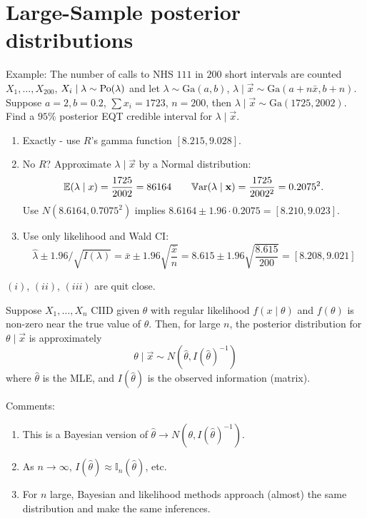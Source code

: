 \documentclass[10pt, a4paper]{article}
\begin{document}
\section{Large-Sample posterior distributions}
Example:
The number of calls to NHS $111$ in $200$ short intervals are counted $X_1, \dotsc, X_{200}$,
$X_i \mid \lambda \sim \operatorname{Po}(\lambda)$ and let $\lambda \sim \mathrm{Ga}(a, b)$,
$\lambda \mid \vec{x} \sim \mathrm{Ga}(a + n\bar{x}, b + n)$.
Suppose $a = 2, b = 0.2$,
$\sum x_i = 1723$,
$n = 200$,
then $\lambda \mid \vec{x} \sim \mathrm{Ga}(1725, 2002)$.
Find a $95\%$ posterior EQT credible interval for $\lambda \mid \vec{x}$.
\begin{enumerate}[label = (\roman*)]
    \item Exactly -
    use $R$'s gamma function $[8.215, 9.028]$.

    \item No $R$?
    Approximate $\lambda \mid \vec{x}$ by a Normal distribution:
    \[
    \mathbb{E}(\lambda \mid x) = \frac{1725}{2002} = 86164\qquad \mathbb{V}\mathrm{ar}(\lambda \mid \mathbf{x}) = \frac{1725}{2002 ^ 2} = 0.2075 ^ 2.
    \]
    Use $N(8.6164, 0.7075 ^ 2)$ implies $8.6164 \pm 1.96 \cdot 0.2075 = [8.210, 9.023]$.

    \item Use only likelihood and Wald CI:
    \[
    \hat{\lambda} \pm 1.96 / \sqrt{I(\lambda)} = \bar{x} \pm 1.96\sqrt{\frac{\bar{x}}{n}} = 8.615 \pm 1.96\sqrt{\frac{8.615}{200}} = [8.208, 9.021]
    \]
\end{enumerate}
$(i)$,
$(ii)$,
$(iii)$ are quit close.

\begin{proposition}
    Suppose $X_1, \dotsc, X_n$ CIID given $\theta$ with regular likelihood $f(x \mid \theta)$ and $f(\theta)$ is non-zero near the true value of $\theta$.
    Then,
    for large $n$,
    the posterior distribution for $\theta \mid \vec{x}$ is approximately
    \[
    \theta \mid \vec{x} \sim N(\hat{\theta}, I(\hat{\theta}) ^ {-1})
    \]
    where $\hat{\theta}$ is the MLE,
    and $I(\hat{\theta})$ is the observed information
    (matrix).
\end{proposition}

Comments:
\begin{enumerate}[label = (\roman*)]
    \item This is a Bayesian version of $\hat{\theta} \to N(\theta, I(\hat{\theta}) ^ {-1})$.

    \item As $n \to \infty$,
    $I(\hat{\theta}) \approx \mathbb{I}_n(\hat{\theta})$,
    etc.
    \item For $n$ large,
    Bayesian and likelihood methods approach
    (almost)
    the same distribution and make the same inferences.
\end{enumerate}
\end{document}
